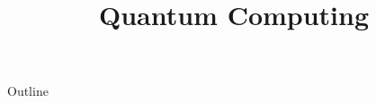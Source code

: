 \documentclass[xcolor=dvipsnames,compress,t,pdf,9pt]{beamer}
\title[\insertframenumber /\inserttotalframenumber]{Quantum Computing}
\begin{document}
	\begin{frame}
	\titlepage
	\end{frame}
	
	\begin{frame}{Outline}
	    \tableofcontents
	\end{frame}

	
	
	
	
	
\end{document}
